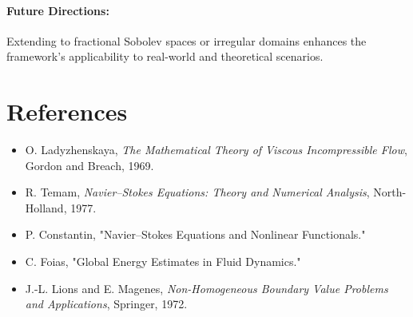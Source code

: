 \paragraph{Future Directions:} Extending to fractional Sobolev spaces or irregular domains enhances the framework's applicability to real-world and theoretical scenarios.

\section*{References}
\begin{itemize}
    \item O. Ladyzhenskaya, \emph{The Mathematical Theory of Viscous Incompressible Flow}, Gordon and Breach, 1969.
    \item R. Temam, \emph{Navier--Stokes Equations: Theory and Numerical Analysis}, North-Holland, 1977.
    \item P. Constantin, "Navier--Stokes Equations and Nonlinear Functionals."
    \item C. Foias, "Global Energy Estimates in Fluid Dynamics."
    \item J.-L. Lions and E. Magenes, \emph{Non-Homogeneous Boundary Value Problems and Applications}, Springer, 1972.
\end{itemize}

